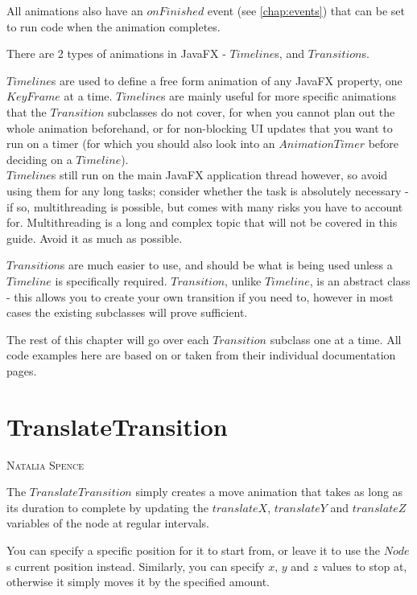 \documentclass[a4paper]{report}
\makeatletter
\newcommand{\sectionauthor}[1]{%
	{\parindent0pt\vspace*{0pt}%
		\linespread{1.1}\large\scshape#1%
		\par\nobreak\vspace*{10pt}}
	\@afterheading%
}
\makeatother
\begin{document}
		All animations also have an $onFinished$ event (see \vref{chap:events}) that can be set to run code when the animation completes.
		
		\pagebreak
		
		There are 2 types of animations in JavaFX - $Timeline$s, and $Transition$s.
		
		$Timeline$s are used to define a free form animation of any JavaFX property, one $KeyFrame$ at a time. $Timeline$s are mainly useful for more specific animations that the $Transition$ subclasses do not cover, for when you cannot plan out the whole animation beforehand, or for non-blocking UI updates that you want to run on a timer (for which you should also look into an $AnimationTimer$ before deciding on a $Timeline$). \\
		$Timeline$s still run on the main JavaFX application thread however, so avoid using them for any long tasks; consider whether the task is absolutely necessary - if so, multithreading is possible, but comes with many risks you have to account for. Multithreading is a long and complex topic that will not be covered in this guide. Avoid it as much as possible.
		
		$Transition$s are much easier to use, and should be what is being used unless a $Timeline$ is specifically required. $Transition$, unlike $Timeline$, is an abstract class - this allows you to create your own transition if you need to, however in most cases the existing subclasses will prove sufficient.
		
		The rest of this chapter will go over each $Transition$ subclass one at a time. All code examples here are based on or taken from their individual documentation pages.
		
		\section{TranslateTransition}\label{sec:translate transition}
		\sectionauthor{Natalia Spence}
		
			The $TranslateTransition$ simply creates a move animation that takes as long as its duration to complete by updating the $translateX$, $translateY$ and $translateZ$ variables of the node at regular intervals.
			
			You can specify a specific position for it to start from, or leave it to use the $Node$s current position instead. Similarly, you can specify $x$, $y$ and $z$ values to stop at, otherwise it simply moves it by the specified amount.
			
\end{document}
